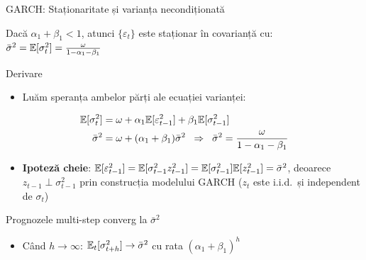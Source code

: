 \documentclass[9pt, aspectratio=169, t]{beamer}
\begin{document}
\begin{frame}{GARCH: Staționaritate și varianța necondiționată}
    \vspace{-3mm}
    \begin{thm}
        Dacă $\alpha_1 + \beta_1 < 1$, atunci $\{\varepsilon_t\}$ este staționar în covarianță cu:
        $\bar{\sigma}^2 = \mathbb{E}[\sigma_t^2] = \frac{\omega}{1 - \alpha_1 - \beta_1}$
    \end{thm}
    \vspace{-1mm}
    {\small
    \begin{exampleblock}{Derivare}
        \begin{itemize}\setlength{\itemsep}{0pt}
            \item Luăm speranța ambelor părți ale ecuației varianței:
        \end{itemize}
        \vspace{-2mm}
        \begin{align*}
            \mathbb{E}[\sigma_t^2] &= \omega + \alpha_1 \mathbb{E}[\varepsilon_{t-1}^2] + \beta_1 \mathbb{E}[\sigma_{t-1}^2] \\
            \bar{\sigma}^2 &= \omega + (\alpha_1 + \beta_1)\bar{\sigma}^2 \;\;\Rightarrow\;\; \bar{\sigma}^2 = \frac{\omega}{1 - \alpha_1 - \beta_1}
        \end{align*}
        \vspace{-4mm}
        \begin{itemize}\setlength{\itemsep}{0pt}
            \item \textbf{Ipoteză cheie}: $\mathbb{E}[\varepsilon_{t-1}^2] = \mathbb{E}[\sigma_{t-1}^2 z_{t-1}^2] = \mathbb{E}[\sigma_{t-1}^2]\mathbb{E}[z_{t-1}^2] = \bar{\sigma}^2$, deoarece $z_{t-1} \perp \sigma_{t-1}^2$ prin construcția modelului GARCH ($z_t$ este i.i.d.\ și independent de $\sigma_t$)
        \end{itemize}
        \vspace{-2mm}
    \end{exampleblock}
    }
    \vspace{-1mm}
    \begin{alertblock}{Prognozele multi-step converg la $\bar{\sigma}^2$}
        \begin{itemize}\setlength{\itemsep}{0pt}
            \item Când $h \to \infty$: $\mathbb{E}_t[\sigma_{t+h}^2] \to \bar{\sigma}^2$ cu rata $(\alpha_1 + \beta_1)^h$
        \end{itemize}
    \end{alertblock}
\end{frame}
\end{document}

